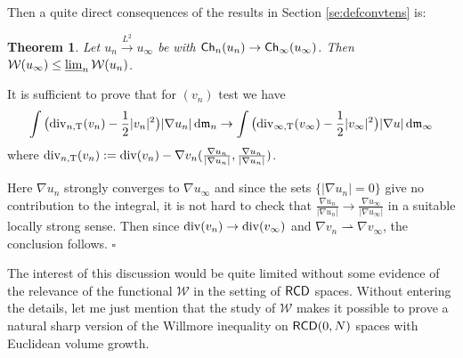 \documentclass[11pt]{article}
\numberwithin{equation}{section}
\newtheorem{theorem}{Theorem}[section]
\newenvironment{idea}{\removelastskip\par\medskip   %
\noindent{\em Idea of the proof} \rm}{\penalty-20\null\hfill$\square$\par\medbreak}
\newcommand{\mm}{{\mathfrak m}}
\newcommand{\RCD}{{\sf RCD}}
\newcommand{\ch}{{\sf Ch}}
\renewcommand{\d}{{\rm d}}
\renewcommand{\div}{{\rm div}}
\newcommand{\limi}{\varliminf}
\newcommand{\weakto}{\rightharpoonup}
\newcommand{\WW}{\mathcal W}
\begin{document}
Then a quite direct consequences of the results in Section \ref{se:defconvtens} is:
\begin{theorem}
Let $u_n\stackrel{L^2}\to u_\infty$ be with $\ch_n(u_n)\to \ch_\infty(u_\infty)$. Then $\WW(u_\infty)\leq \limi_n\WW(u_n)$.
\end{theorem}
\begin{idea} It is sufficient to prove that for $(v_n)$ test we have 
\[
\int \big(\div_{n,{\rm T}}(v_n)-\frac12|v_n|^2\big)|\nabla u_n|\,\d\mm_n\to \int \big(\div_{\infty,{\rm T}}(v_\infty)-\frac12|v_\infty|^2\big)|\nabla u|\,\d\mm_\infty
\]
where $\div_{n,{\rm T}}(v_n):=\div(v_n)-\nabla v_n(\tfrac{\nabla u_n}{|\nabla u_n|},\tfrac{\nabla u_n}{|\nabla u_n|})$. 

Here $\nabla u_n$ strongly converges to $\nabla u_\infty$ and since the sets $\{|\nabla u_n|=0\}$ give no contribution to the integral, it is not hard to check that $\frac{\nabla u_n}{|\nabla u_n|}\to \frac{\nabla u_\infty}{|\nabla u_\infty|}$ in a suitable locally strong sense. Then since $\div(v_n)\to \div(v_\infty)$  and $\nabla v_n\weakto \nabla v_\infty$, the conclusion follows.
\end{idea}
The interest of this discussion would be quite limited without some evidence of the relevance of the functional $\WW$ in the setting of $\RCD$ spaces. Without entering the details, let me just mention that  the study of $\WW$ makes it possible to prove a natural sharp version of the Willmore inequality on  $\RCD(0,N)$ spaces with Euclidean volume growth.
\end{document}
